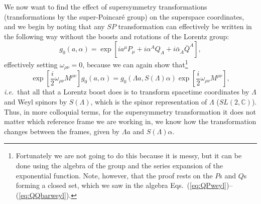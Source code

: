 \documentclass[notes.tex]{subfiles}
\begin{document}
We now want to find the effect of supersymmetry transformations (transformations by the super-Poincaré group) on the superspace coordinates, and we begin by noting that any $SP$ transformation can effectively be written in the following way without the boosts and rotations of the Lorentz group:
\[g_0(a,\alpha) = \exp[ia^\mu P_\mu + i\alpha^AQ_A +i\bar{\alpha}_{\dot{A}}\bar{Q}^{\dot{A}}],\]
effectively setting $\omega_{\rho\nu}=0$, because we can again show that\footnote{Fortunately we are not going to do this because it is messy, but it can be done using the algebra of the group and the series expansion of the exponential function. Note, however, that the proof rests on the $P$s and $Q$s forming a closed set, which we saw in the algebra Eqs.~(\ref{eq:QPweyl})--(\ref{eq:QQbarweyl}).}
\begin{equation}
\exp\left[\frac{i}{2}\omega_{\rho\nu}M^{\rho\nu}\right]g_0(a,\alpha) = g_0(\Lambda a,S(\Lambda)\alpha)\exp\left[\frac{i}{2}\omega_{\rho\nu}M^{\rho\nu}\right],
\end{equation}
{\it i.e.}\ that all that a Lorentz boost does is to transform spacetime coordinates by $\Lambda$ and Weyl spinors by $S(\Lambda)$, which is the spinor representation of $\Lambda$ ($SL(2,\mathbb C)$). Thus, in more colloquial terms, for the supersymmetry transformation it does not matter which reference frame we are working in, we know how the transformation changes between the frames, given by  $\Lambda a$  and $S(\Lambda)\alpha$. 
\end{document}
